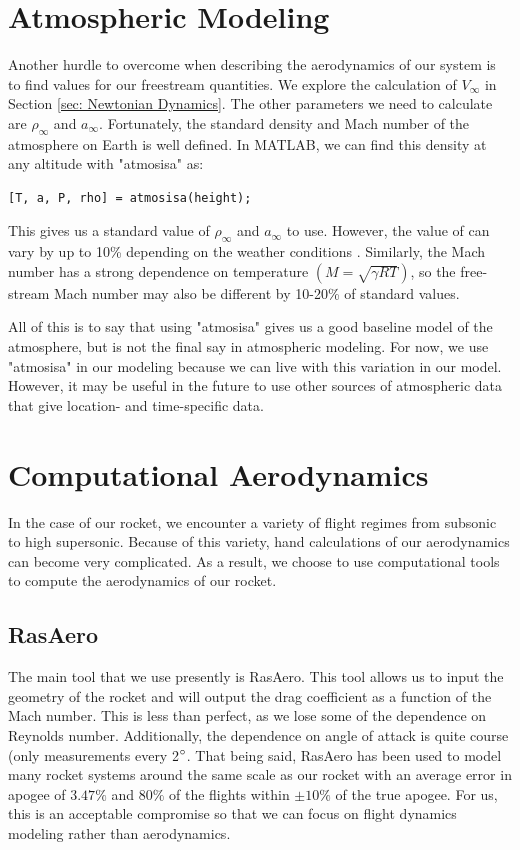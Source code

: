 \documentclass[12pt]{report}
\begin{document}
{\section{Atmospheric Modeling}
Another hurdle to overcome when describing the aerodynamics of our system is to find values for our \gls{freestream} quantities. We explore the calculation of $V_{\infty}$ in Section \ref{sec: Newtonian Dynamics}. The other parameters we need to calculate are $\rho_{\infty}$ and $a_{\infty}$. Fortunately, the standard density and Mach number of the atmosphere on Earth is well defined. In MATLAB, we can find this density at any altitude with "atmosisa" as:
\begin{lstlisting}[style=Matlab-editor]
    [T, a, P, rho] = atmosisa(height);
\end{lstlisting}
This gives us a standard value of $\rho_{\infty}$ and $a_{\infty}$ to use. However, the value of can vary by up to 10\% depending on the weather conditions \cite{svickova_air_2020}. Similarly, the Mach number has a strong dependence on temperature $\left(M=\sqrt{\gamma RT}\right)$, so the free-stream Mach number may also be different by 10-20\% of standard values. 

All of this is to say that using "atmosisa" gives us a good baseline model of the atmosphere, but is not the final say in atmospheric modeling. For now, we use "atmosisa" in our modeling because we can live with this variation in our model. However, it may be useful in the future to use other sources of atmospheric data that give location- and time-specific data.
\section{Computational Aerodynamics}
In the case of our rocket, we encounter a variety of flight regimes from subsonic to high supersonic. Because of this variety, hand calculations of our aerodynamics can become very complicated. As a result, we choose to use computational tools to compute the aerodynamics of our rocket.
\subsection{RasAero}
The main tool that we use presently is RasAero. This tool allows us to input the geometry of the rocket and will output the drag coefficient as a function of the Mach number. This is less than perfect, as we lose some of the dependence on Reynolds number. Additionally, the dependence on angle of attack is quite course (only measurements every 2$\degree$. That being said, RasAero has been used to model many rocket systems around the same scale as our rocket with an average error in apogee of $3.47\%$ and $80\%$ of the flights within $\pm10\%$ of the true apogee. For us, this is an acceptable compromise so that we can focus on flight dynamics modeling rather than aerodynamics.

}
\end{document}
